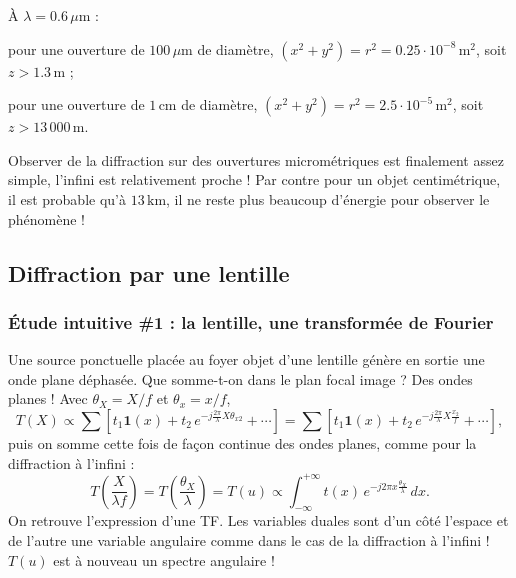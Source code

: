 \begin{example}
  À $\lambda = 0.6\,\mu\mathrm{m}$ :
  \begin{subpart}
    \item pour une ouverture de $100\,\mu\mathrm{m}$ de diamètre,
      $(x^2+y^2) = r^2 =
      0.25 \cdot 10^{-8}\,\mathrm{m}^2$, soit $z > 1.3\,\mathrm{m}$ ;
    \item pour une ouverture de $1\,\mathrm{cm}$ de diamètre,
      $(x^2+y^2) = r^2 =
      2.5 \cdot 10^{-5}\,\mathrm{m}^2$, soit $z > 13\,000\,\mathrm{m}$.
  \end{subpart}
  Observer de la diffraction sur des ouvertures micrométriques est finalement
  assez simple, l'infini est relativement proche ! Par contre pour un objet
  centimétrique, il est probable qu'à $13\,\mathrm{km}$, il ne reste plus
  beaucoup d'énergie pour observer le phénomène !
\end{example}

\subsection{Diffraction par une lentille}

\subsubsection{Étude intuitive \#1 : la lentille, une transformée de Fourier}
Une source ponctuelle placée au foyer objet d'une lentille génère en sortie une
onde plane déphasée. Que somme-t-on dans le plan focal image ? Des ondes
planes ! Avec $\theta_X = X/f$ et $\theta_x = x/f$,
\begin{equation*}
  T(X) \propto \sum \left[ t_1 \mathbf{1}(x)
     + t_2\, e^{-j\frac{2\pi}{\lambda} X \theta_{x2}} + \cdots \right]
     = \sum \left[ t_1 \mathbf{1}(x)
     + t_2\, e^{-j\frac{2\pi}{\lambda} X \frac{x_2}{f}} + \cdots \right],
\end{equation*}
puis on somme cette fois de façon continue des ondes planes, comme pour la
diffraction à l'infini :
\begin{equation*}
  T\!\left(\frac{X}{\lambda f}\right) = T\!\left(\frac{\theta_X}{\lambda}\right)
  = T(u) \propto \int_{-\infty}^{+\infty} t(x)\,
    e^{-j2\pi x \frac{\theta_X}{\lambda}}\, dx .
\end{equation*}
On retrouve l'expression d'une TF. Les variables duales sont d'un côté l'espace
et de l'autre une variable angulaire comme dans le cas de la diffraction à
l'infini ! $T(u)$ est à nouveau un spectre angulaire !

